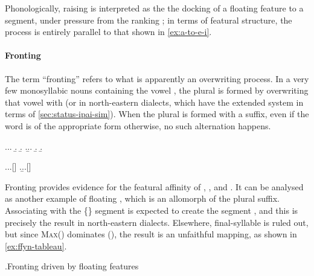 Phonologically, raising is interpreted as the the docking of a floating  feature to a  segment, under pressure from the ranking ; in terms of featural structure, the process is entirely parallel to that shown in \ref{ex:a-to-e-i}.

\paragraph{Fronting}
\label{sec:fronting-1}

The term \enquote{fronting} refers to what is apparently an overwriting process. In a very few monosyllabic nouns containing the vowel \ipa{[o]}, the plural is formed by overwriting that vowel with \ipa{[i]} (or \ipa{[ə]} in north-eastern dialects, which have the extended system in terms of \cref{sec:status-ipai-sim}). When the plural is formed with a suffix, even if the word is of the appropriate form otherwise, no such alternation happens.

\ex.\a.\a.
\b.
\b.\mbi{[ˈfərð]}
\z.\b.\a.
\b.
\b.\mbi{[ˈfən]}

\ex.\a.\a.[]
\z.\b.\a.[]

Fronting provides evidence for the featural affinity of \ipa{[o]}, \ipa{[ə]}, and \ipa{[i]}. It can be analysed as another example of floating , which is an allomorph of the plural suffix. Associating  with the \{\} segment \ipa{[o]} is expected to create the segment \ipa{[ə]}, and this is precisely the result in north-eastern dialects. Elsewhere, final-syllable \ipa{[ə]} is ruled out, but since \textsc{Max}() dominates (), the result is an unfaithful mapping, as shown in \ref{ex:ffyn-tableau}.

\ex.\label{ex:ffyn-tableau}Fronting driven by floating features\\

